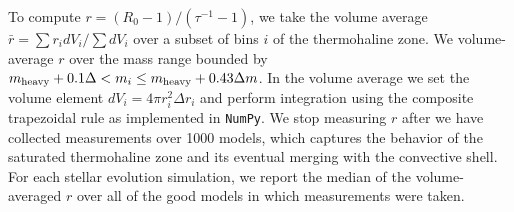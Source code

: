 To compute $r = (R_0 - 1)/(\tau^{-1} - 1)$, we take the volume average $\bar{r} = \sum r_i dV_i / \sum dV_i$ over a subset of bins $i$ of the thermohaline zone.
We volume-average $r$ over the mass range bounded by $m_{\rm{heavy}} + 0.1\Delta  < m_i \leq m_{\rm heavy} + 0.43\Delta m$.
In the volume average we set the volume element $dV_i = 4\pi r_i^2 \Delta r_i$ and perform integration using the composite trapezoidal rule as implemented in \texttt{NumPy}.
We stop measuring $r$ after we have collected measurements over 1000 models, which captures the behavior of the saturated thermohaline zone and its eventual merging with the convective shell.
For each stellar evolution simulation, we report the median of the volume-averaged $r$ over all of the good models in which measurements were taken.